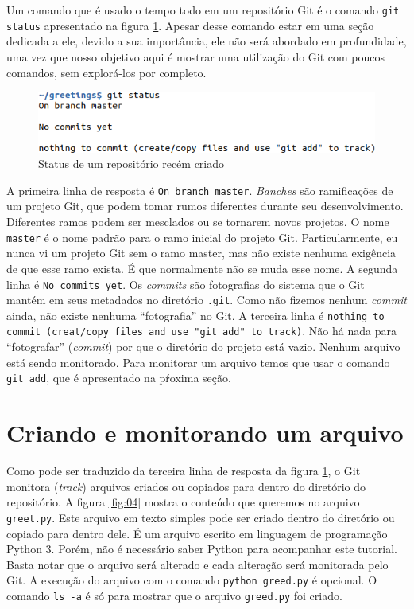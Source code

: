 \documentclass[a4paper]{book}
\begin{document}
Um comando que é usado o tempo todo em um repositório Git é o comando
\texttt{git status} apresentado na figura \ref{fig:03}.
Apesar desse comando estar em uma seção dedicada a ele, 
devido a sua importância, ele não será abordado em profundidade,
uma vez que nosso objetivo aqui é mostrar uma utilização do Git
com poucos comandos, sem explorá-los por completo.

\begin{figure}[ht]
\caption{Status de um repositório recém criado}
\label{fig:03}
\centering
\includegraphics[scale=0.6]{"images/03-Status de um repositório recém criado.png"}
\end{figure}

A primeira linha de resposta é \texttt{On branch master}.
\textit{Banches} são ramificações de um projeto Git, 
que podem tomar rumos diferentes durante seu desenvolvimento.
Diferentes ramos podem ser mesclados ou se tornarem novos projetos.
O nome \texttt{master} é o nome padrão para o ramo inicial do projeto Git.
Particularmente, eu nunca vi um projeto Git sem o ramo master,
mas não existe nenhuma exigência de que esse ramo exista.
É que normalmente não se muda esse nome.
%
A segunda linha é \texttt{No commits yet}.
Os \textit{commits} são fotografias do sistema que o Git mantém
em seus metadados no diretório \texttt{.git}.
Como não fizemos nenhum \textit{commit} ainda, não existe nenhuma
``fotografia'' no Git.
%
A terceira linha é 
\texttt{nothing to commit (creat/copy files and use "git add" to track)}.
Não há nada para ``fotografar'' (\textit{commit}) por que o diretório
do projeto está vazio.
Nenhum arquivo está sendo monitorado.
Para monitorar um arquivo temos que usar o comando \texttt{git add},
que é apresentado na pŕoxima seção.


\section{Criando e monitorando um arquivo}

Como pode ser traduzido da terceira linha de resposta da figura
\ref{fig:03}, o Git monitora (\textit{track}) arquivos criados
ou copiados para dentro do diretório do repositório.
A figura \ref{fig:04} mostra o conteúdo que queremos no arquivo
\texttt{greet.py}.
Este arquivo em texto simples pode ser criado dentro do diretório
ou copiado para dentro dele.
É um arquivo escrito em linguagem de programação Python 3.
Porém, não é necessário saber Python para acompanhar este tutorial.
Basta notar que o arquivo será alterado e cada alteração será monitorada
pelo Git. A execução do arquivo com o comando \texttt{python greed.py} é 
opcional. O comando \texttt{ls -a} é só para mostrar que o arquivo 
\texttt{greed.py} foi criado.
\end{document}
